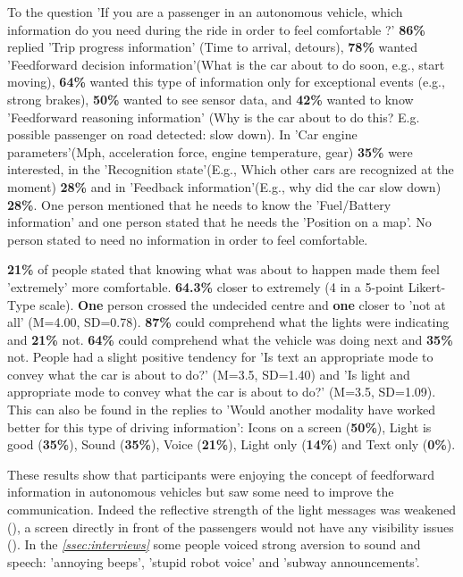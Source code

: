 To the question 'If you are a passenger in an autonomous vehicle, which information do you need during the ride in order to feel comfortable ?' 
\textbf{86\%} replied 'Trip progress information' (Time to arrival, detours), \textbf{78\%} wanted 'Feedforward decision information'(What is the car about to do soon, e.g., start moving), \textbf{64\%} wanted this type of information only for exceptional events (e.g., strong brakes), \textbf{50\%} wanted to see sensor data, and \textbf{42\%} wanted to know 'Feedforward reasoning information' (Why is the car about to do this? E.g. possible passenger on road detected: slow down). In 'Car engine parameters'(Mph, acceleration force, engine temperature, gear) \textbf{35\%} were interested, in the 'Recognition state'(E.g., Which other cars are recognized at the moment) \textbf{28\%} and in 'Feedback information'(E.g., why did the car slow down) \textbf{28\%}. One person mentioned that he needs to know the 'Fuel/Battery information' and one person stated that he needs the 'Position on a map'. No person stated to need no information in order to feel comfortable. 

\textbf{21\%} of people stated that knowing what was about to happen made them feel 'extremely' more comfortable. \textbf{64.3\%} closer to extremely (4 in a 5-point Likert-Type scale). \textbf{One} person crossed the undecided centre and \textbf{one} closer to 'not at all' (M=4.00, SD=0.78). \textbf{87\%} could comprehend what the lights were indicating and \textbf{21\%} not. \textbf{64\%} could comprehend what the vehicle was doing next and \textbf{35\%} not. People had a slight positive tendency for 'Is text an appropriate mode to convey what the car is about to do?' (M=3.5, SD=1.40) and  'Is light and appropriate mode to convey what the car is about to do?' (M=3.5, SD=1.09). This can also be found in the replies to 'Would another modality have worked better for this type of driving information': Icons on a screen (\textbf{50\%}), Light is good (\textbf{35\%}), Sound (\textbf{35\%}), Voice (\textbf{21\%}), Light only (\textbf{14\%}) and Text only (\textbf{0\%}). 

These results show that participants were enjoying the concept of feedforward information in autonomous vehicles but saw some need to improve the communication. Indeed the reflective strength of the light messages was weakened (\emph{}), a screen directly in front of the passengers would not have any visibility issues (\emph{}). In the \emph{\ref{ssec:interviews}} some people voiced strong aversion to sound and speech: 'annoying beeps', 'stupid robot voice' and 'subway announcements'. 

